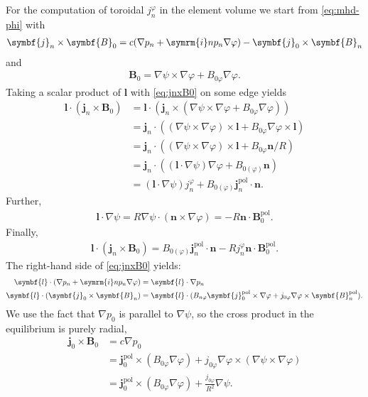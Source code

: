 \documentclass[a4paper, 10pt, english]{article}
\let\temp\vartheta
\let\vartheta\theta
\let\theta\temp
\let\temp\varphi
\let\varphi\phi
\let\phi\temp
\let\vec\symbf
\newcommand*\im{\ensuremath{\symrm{i}}}  %
\newcommand*\pol{\ensuremath{\textrm{pol}}}  %
\begin{document}
For the computation of toroidal $j_{n}^{\phi}$ in the element volume we start from \cref{eq:mhd-phi} with
\begin{gather}
  \vec{j}_{n} \times \vec{B}_{0} = c (\nabla p_{n} + \im n p_{n} \nabla \phi) - \vec{j}_{0} \times \vec{B}_{n} \label{eq:jnxB0}
\end{gather}
and
\begin{gather}
  \vec{B}_{0} = \nabla \psi \times \nabla \phi + B_{0 \phi} \nabla \phi.
\end{gather}
Taking a scalar product of $\vec{l}$ with \cref{eq:jnxB0} on some edge yields
\begin{align}
  \vec{l} \cdot (\vec{j}_{n} \times \vec{B}_{0}) &= \vec{l} \cdot (\vec{j}_{n} \times (\nabla \psi \times \nabla \phi + B_{0 \phi} \nabla \phi)) \nonumber \\
  &= \vec{j}_{n} \cdot ((\nabla \psi \times \nabla \phi) \times \vec{l} + B_{0 \phi} \nabla \phi \times \vec{l}) \nonumber \\
  &= \vec{j}_{n} \cdot ((\nabla \psi \times \nabla \phi) \times \vec{l} + B_{0 \phi} \vec{n} / R) \nonumber \\
  &= \vec{j}_{n} \cdot \left( (\vec{l} \cdot \nabla \psi) \nabla \phi + B_{0 (\phi)} \vec{n} \right) \nonumber \\
  &= (\vec{l} \cdot \nabla \psi) j_{n}^{\phi} + B_{0 (\phi)} \vec{j}_{n}^{\pol} \cdot \vec{n}.
\end{align}
Further,
\begin{gather}
  \vec{l} \cdot \nabla \psi = R \nabla \psi \cdot \left( \vec{n} \times \nabla \phi \right) = -R \vec{n} \cdot \vec{B}_{0}^{\pol}.
\end{gather}
Finally,
\begin{gather}
  \vec{l} \cdot (\vec{j}_{n} \times \vec{B}_{0}) = B_{0 (\phi)} \vec{j}_{n}^{\pol} \cdot \vec{n} - R j_{n}^{\phi} \vec{n} \cdot \vec{B}_{0}^{\pol}.
\end{gather}
The right-hand side of \cref{eq:jnxB0} yields:
\begin{align}
  \vec{l} \cdot (\nabla p_{n} + \im n p_{n} \nabla \phi) &= \vec{l} \cdot \nabla p_{n} \\
  \vec{l} \cdot (\vec{j}_{0} \times \vec{B}_{n}) &= \vec{l} \cdot (B_{n \phi} \vec{j}_{0}^{\pol} \times \nabla \phi + j_{0 \phi} \nabla \phi \times \vec{B}_{n}^{\pol}).
\end{align}
We use the fact that $\nabla p_{0}$ is parallel to $\nabla \psi$, so the cross product in the equilibrium is purely radial,
\begin{align}
  \vec{j}_{0} \times \vec{B}_{0} &= c \nabla p_{0} \nonumber \\
  &= \vec{j}_{0}^{\pol} \times (B_{0 \phi} \nabla \phi) + j_{0 \phi} \nabla \phi \times (\nabla \psi \times \nabla \phi) \nonumber \\
  &= \vec{j}_{0}^{\pol} \times (B_{0 \phi} \nabla \phi) + \frac{j_{0 \phi}}{R^{2}} \nabla \psi.
\end{align}
\end{document}
